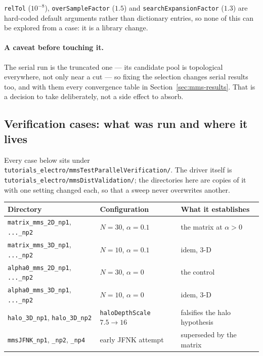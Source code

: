 \documentclass[11pt,a4paper]{article}
\newcommand{\code}[1]{\texttt{\small #1}}
\begin{document}
\code{relTol} ($10^{-8}$), \code{overSampleFactor} ($1.5$) and
\code{searchExpansionFactor} ($1.3$) are hard-coded default arguments rather
than dictionary entries, so none of this can be explored from a case: it is a
library change.

\paragraph{A caveat before touching it.} The serial run is the truncated one
--- its candidate pool is topological everywhere, not only near a cut --- so
fixing the selection changes serial results too, and with them every
convergence table in Section~\ref{sec:mms-results}. That is a decision to take
deliberately, not a side effect to absorb.



\subsection{Verification cases: what was run and where it lives}
\label{sec:parverif-cases}

Every case below sits under
\code{tutorials\_electro/mmsTestParallelVerification/}. The driver itself is
\code{tutorials\_electro/mmsDistValidation/}; the directories here are copies of
it with one setting changed each, so that a sweep never overwrites another.

\begin{center}
\begin{tabular}{@{}lll@{}}
\toprule
Directory & Configuration & What it establishes \\
\midrule
\code{matrix\_mms\_2D\_np1}, \code{...\_np2}   & $N=30$, $\alpha=0.1$ & the matrix at $\alpha>0$ \\
\code{matrix\_mms\_3D\_np1}, \code{...\_np2}   & $N=10$, $\alpha=0.1$ & idem, 3-D \\
\code{alpha0\_mms\_2D\_np1}, \code{...\_np2}   & $N=30$, $\alpha=0$   & the control \\
\code{alpha0\_mms\_3D\_np1}, \code{...\_np2}   & $N=10$, $\alpha=0$   & idem, 3-D \\
\code{halo\_3D\_np1}, \code{halo\_3D\_np2}     & \code{haloDepthScale} $7.5\to16$ & falsifies the halo hypothesis \\
\code{mmsJFNK\_np1}, \code{\_np2}, \code{\_np4} & early JFNK attempt & superseded by the matrix \\
\bottomrule
\end{tabular}
\end{center}
\end{document}
